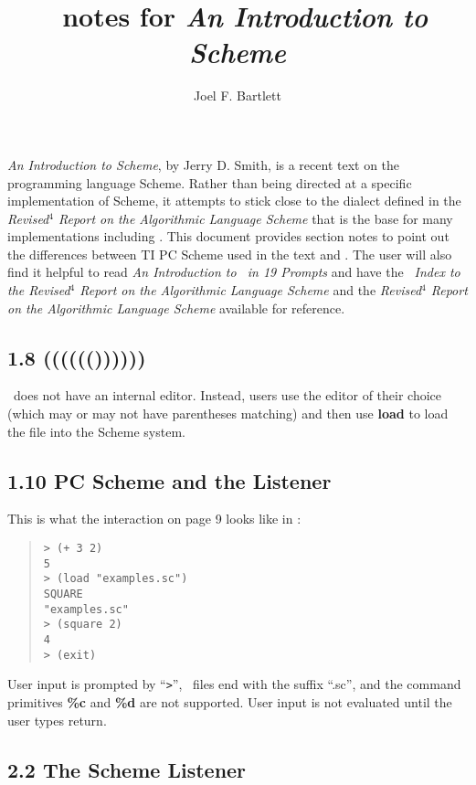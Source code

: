 \documentclass[10pt]{article}
\title{\StoC\ notes for \emph{An Introduction to Scheme}}
\author{Joel F. Bartlett}
\date{}
\begin{document}
\maketitle

\emph{An Introduction to Scheme}, by Jerry D. Smith, is a recent
text on the programming language Scheme.  Rather than being
directed at a specific implementation of Scheme, it attempts
to stick close to the dialect defined in the \emph{Revised$^4$
Report on the Algorithmic Language Scheme} that is the base
for many implementations including \StoC.  This document
provides section notes to point out the differences between TI
PC Scheme used in the text and \StoC.  The user will also
find it helpful to read \emph{An Introduction to \StoC\ in 19
Prompts} and have the \emph{\StoC\ Index to the Revised$^4$
Report on the Algorithmic Language Scheme} and the
\emph{Revised$^4$ Report on the Algorithmic Language Scheme}
available for reference.

\subsection*{1.8 (((((())))))}

\StoC\ does not have an internal editor.  Instead, users
use the editor of their choice (which may or may not have
parentheses matching) and then use \textbf{load} to load the file
into the Scheme system.

\subsection*{1.10 PC Scheme and the Listener}

This is what the interaction on page 9 looks like in \StoC:

\begin{quote}
\begin{verbatim}
> (+ 3 2)
5
> (load "examples.sc")
SQUARE
"examples.sc"
> (square 2)
4
> (exit)
\end{verbatim}
\end{quote}

User input is prompted by ``\texttt{>}'', \StoC\ files end with the
suffix ``.sc'', and the command primitives \textbf{\%c} and \textbf{\%d} are
not supported.  User input is not evaluated until the user
types return.

\subsection*{2.2 The Scheme Listener}
\end{document}
